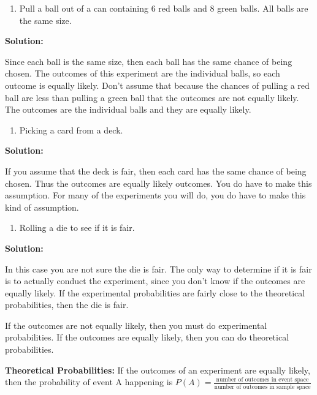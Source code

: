 \documentclass[
]{book}
\providecommand{\tightlist}{%
  \setlength{\itemsep}{0pt}\setlength{\parskip}{0pt}}
\begin{document}
\begin{enumerate}
\def\labelenumi{\alph{enumi}.}
\setcounter{enumi}{2}
\tightlist
\item
  Pull a ball out of a can containing 6 red balls and 8 green balls. All balls are the same size.
\end{enumerate}

\textbf{Solution:}

Since each ball is the same size, then each ball has the same chance of being chosen. The outcomes of this experiment are the individual balls, so each outcome is equally likely. Don't assume that because the chances of pulling a red ball are less than pulling a green ball that the outcomes are not equally likely. The outcomes are the individual balls and they are equally likely.

\begin{enumerate}
\def\labelenumi{\alph{enumi}.}
\setcounter{enumi}{3}
\tightlist
\item
  Picking a card from a deck.
\end{enumerate}

\textbf{Solution:}

If you assume that the deck is fair, then each card has the same chance of being chosen. Thus the outcomes are equally likely outcomes. You do have to make this assumption. For many of the experiments you will do, you do have to make this kind of assumption.

\begin{enumerate}
\def\labelenumi{\alph{enumi}.}
\setcounter{enumi}{4}
\tightlist
\item
  Rolling a die to see if it is fair.
\end{enumerate}

\textbf{Solution:}

In this case you are not sure the die is fair. The only way to determine if it is fair is to actually conduct the experiment, since you don't know if the outcomes are equally likely. If the
experimental probabilities are fairly close to the theoretical probabilities, then the die is fair.

If the outcomes are not equally likely, then you must do experimental probabilities. If the outcomes are equally likely, then you can do theoretical probabilities.

\textbf{Theoretical Probabilities:} If the outcomes of an experiment are equally likely, then the probability of event A happening is \(P(A)=\frac{\text{number of outcomes in event space}}{\text{number of outcomes in sample space}}\)
\end{document}
